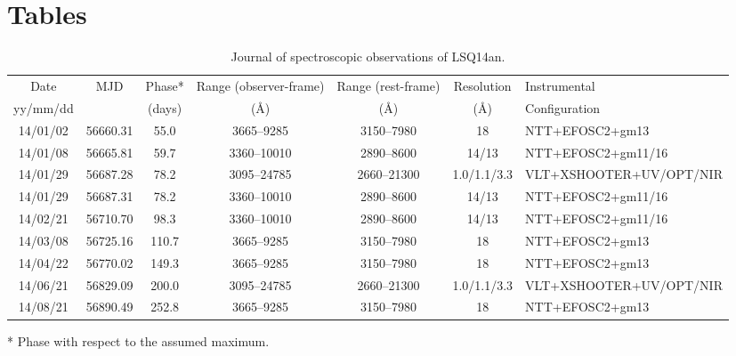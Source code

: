 \documentclass[useAMS,usenatbib]{mn2e}
\def\an{LSQ14an}
\begin{document}
\appendix


\section{Tables}

\begin{table*}
\caption{Journal of spectroscopic observations of \an.}
\begin{center}
\begin{tabular}{ccccccl}
\hline
Date & MJD & Phase* &Range (observer-frame) & Range (rest-frame) &Resolution & Instrumental\\
yy/mm/dd &  & (days)  &(\AA) &(\AA)  & (\AA) &Configuration\\
\hline
14/01/02 &       56660.31 & 55.0 & 3665--9285 &3150--7980 & 18 & NTT+EFOSC2+gm13\\                  
14/01/08&        56665.81        & 59.7  & 3360--10010 & 2890--8600  & 14/13 & NTT+EFOSC2+gm11/16         \\  
14/01/29&       56687.28        & 78.2  & 3095--24785 &2660--21300   & 1.0/1.1/3.3 & VLT+XSHOOTER+UV/OPT/NIR \\                                                                                  
14/01/29&       56687.31         &  78.2  &  3360--10010 & 2890--8600  &  14/13   & NTT+EFOSC2+gm11/16      \\                                                                                                                                                          
14/02/21&        56710.70 & 98.3 &  3360--10010 &2890--8600 &  14/13  & NTT+EFOSC2+gm11/16  \\                       
14/03/08  &      56725.16 & 110.7& 3665--9285 &3150--7980&   18 & NTT+EFOSC2+gm13\\                                                       
14/04/22&         56770.02  &149.3& 3665--9285 &3150--7980&18 & NTT+EFOSC2+gm13\\                                                                                        
14/06/21 &       56829.09&  200.0 & 3095--24785 &2660--21300  & 1.0/1.1/3.3  & VLT+XSHOOTER+UV/OPT/NIR\\                                      
14/08/21 &       56890.49 & 252.8 & 3665--9285 &3150--7980   & 18 & NTT+EFOSC2+gm13\\                                                                                                                                       
\hline
\end{tabular}
\end{center}
* Phase with respect to the assumed maximum.
\label{table:sp}
\end{table*}%
\end{document}
